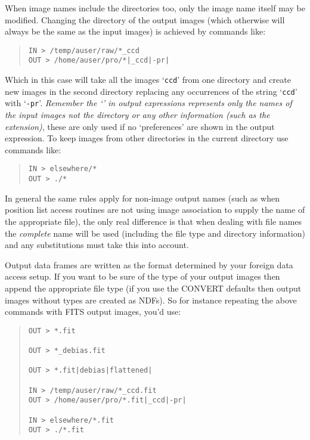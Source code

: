 \documentclass[twoside,11pt]{article}
\renewcommand{\_}{\texttt{\symbol{95}}}
\newenvironment{myquote}{\begin{quote}\begin{small}}{\end{small}\end{quote}}
\newcommand{\text}[1]{{\small \tt #1}}
\begin{document}
When image names include the directories too, only the image name itself may
be modified. Changing the directory of the output images (which otherwise
will always be the same as the input images) is achieved by commands
like:
\begin{myquote}
\begin{verbatim}
IN > /temp/auser/raw/*_ccd
OUT > /home/auser/pro/*|_ccd|-pr|
\end{verbatim}
\end{myquote}
Which in this case will take all the images `\text{*\_ccd}' from one
directory and create new images in the second directory replacing any
occurrences of the string
`\text{\_ccd}' with `\text{-pr}'. {\em Remember the
`\text{*}' in output expressions represents only the names of
the input images not the directory or any other information (such as
the extension)}, these are only used if no `preferences' are shown
in the output expression. To keep images from other directories
in the current directory use commands like:
\begin{myquote}
\begin{verbatim}
IN > elsewhere/*
OUT > ./*
\end{verbatim}
\end{myquote}
In general the same rules apply for non-image output names (such as
when position list access routines are not using image association to
supply the name of the appropriate file), the only real difference is
that when dealing with file names the {\em complete} name will be used
(including the file type and directory information) and any
substitutions must take this into account.

Output data frames are written as the format determined by your
foreign data access setup. If you want to be sure of the type of your
output images then append the appropriate file type (if you use the
CONVERT defaults then output images without types are created as
NDFs). So for instance repeating the above commands with FITS output
images, you'd use:
\begin{myquote}
\begin{verbatim}
OUT > *.fit

OUT > *_debias.fit

OUT > *.fit|debias|flattened|

IN > /temp/auser/raw/*_ccd.fit
OUT > /home/auser/pro/*.fit|_ccd|-pr|

IN > elsewhere/*.fit
OUT > ./*.fit
\end{verbatim}
\end{myquote}
\end{document}
